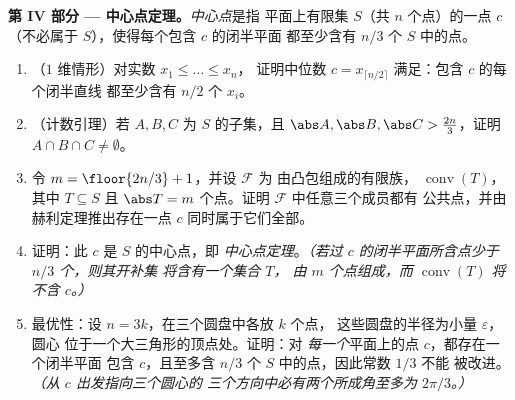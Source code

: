 \begin{problem}
\medskip
\noindent\textbf{第 IV 部分 --- 中心点定理。}\emph{中心点}是指
平面上有限集 $S$（共 $n$ 个点）的一点
$c$（不必属于 $S$），使得每个包含 $c$ 的闭半平面
都至少含有 $n/3$ 个
$S$ 中的点。
\begin{enumerate}[resume]
  \item （$1$ 维情形）对实数 $x_1 \leq \dots \leq x_n$，
        证明中位数 $c = x_{\lceil n/2 \rceil}$
        满足：包含 $c$ 的每个闭半直线
        都至少含有 $n/2$ 个 $x_i$。
  \item （计数引理）若 $A, B, C$ 为 $S$ 的子集，且
        $\abs A, \abs B, \abs C > \tfrac{2n}3$，证明 $A \cap
        B \cap C \neq \emptyset$。
  \item 令 $m = \floor{2n/3} + 1$，并设 $\mathcal F$ 为
        由凸包组成的有限族，
        $\operatorname{conv}(T)$，其中 $T \subseteq S$ 且 $\abs T =
        m$ 个点。证明 $\mathcal F$ 中任意三个成员都有
        公共点，并由赫利定理推出存在一点 $c$
        同时属于它们全部。
  \item 证明：此 $c$ 是 $S$ 的中心点，即
        \emph{中心点定理}。\emph{（若过
        $c$ 的闭半平面所含点少于 $n/3$ 个，则其开补集
        将含有一个集合 $T$，
        由 $m$ 个点组成，而 $\operatorname{conv}(T)$ 将
        不含 $c$。）}
  \item 最优性：设 $n = 3k$，在三个圆盘中各放 $k$ 个点，
        这些圆盘的半径为小量 $\varepsilon$，圆心
        位于一个大三角形的顶点处。证明：对
        \emph{每一个}平面上的点 $c$，都存在一个闭半平面
        包含 $c$，且至多含 $n/3$ 个
        $S$ 中的点，因此常数 $1/3$ 不能
        被改进。\emph{（从 $c$ 出发指向三个圆心的
        三个方向中必有两个所成角至多为
        $2\pi/3$。）}
\end{enumerate}


\end{problem}
